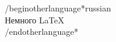 \documentclass[preview]{standalone}
\begin{document}
\begin{center}
/begin{otherlanguage*}{russian} \\ Немного \LaTeX \\ /end{otherlanguage*}
\end{center}
\end{document}
